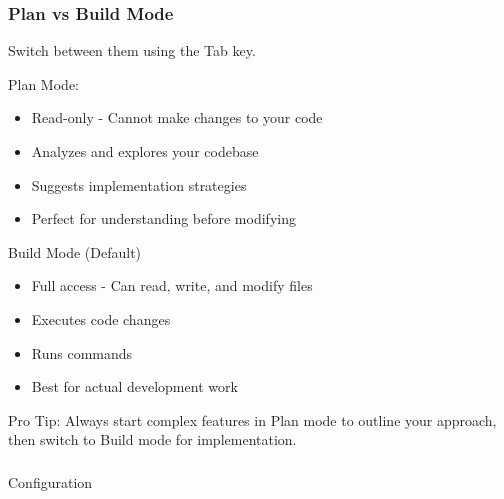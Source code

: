 \begin{frame}[fragile]\frametitle{Plan vs Build Mode}

Switch between them using the Tab key.

Plan Mode:
  \begin{itemize}
    \item Read-only - Cannot make changes to your code
    \item Analyzes and explores your codebase
    \item Suggests implementation strategies
    \item Perfect for understanding before modifying
  \end{itemize}
  
Build Mode (Default)
  \begin{itemize}
    \item Full access - Can read, write, and modify files
    \item Executes code changes
    \item Runs commands
    \item Best for actual development work
  \end{itemize}  
  
Pro Tip: Always start complex features in Plan mode to outline your approach, then switch to Build mode for implementation.  
\end{frame}

\begin{frame}[fragile]\frametitle{}

\begin{center}
{\Large Configuration}
\end{center}
\end{frame}


